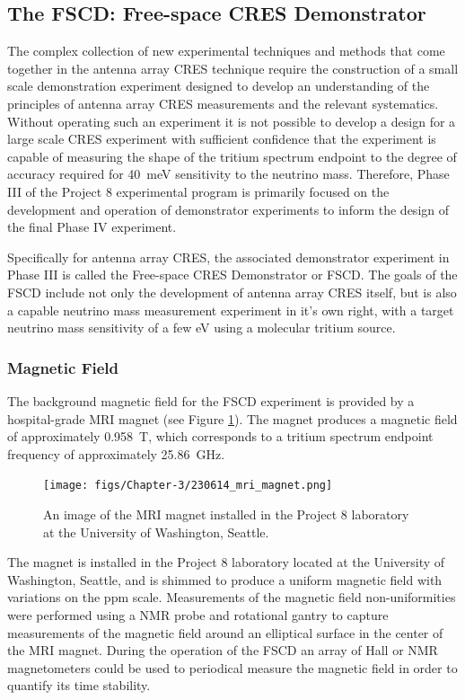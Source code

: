\subsection{The FSCD: Free-space CRES Demonstrator}

The complex collection of new experimental techniques and methods that come together in the antenna array CRES technique require the construction of a small scale demonstration experiment designed to develop an understanding of the principles of antenna array CRES measurements and the relevant systematics. Without operating such an experiment it is not possible to develop a design for a large scale CRES experiment with sufficient confidence that the experiment is capable of measuring the shape of the tritium spectrum endpoint to the degree of accuracy required for 40~meV sensitivity to the neutrino mass. Therefore, Phase III of the Project 8 experimental program is primarily focused on the development and operation of demonstrator experiments to inform the design of the final Phase IV experiment.

Specifically for antenna array CRES, the associated demonstrator experiment in Phase III is called the Free-space CRES Demonstrator or FSCD. The goals of the FSCD include not only the development of antenna array CRES itself, but is also a capable neutrino mass measurement experiment in it's own right, with a target neutrino mass sensitivity of a few eV using a molecular tritium source.  

\subsubsection*{Magnetic Field}

The background magnetic field for the FSCD experiment is provided by a hospital-grade MRI magnet (see Figure \ref{fig:chap3-mri-magnet}). The magnet produces a magnetic field of approximately 0.958~T, which corresponds to a tritium spectrum endpoint frequency of approximately 25.86~GHz. 
\begin{figure}[htbp]
    \centering
    \texttt{[image: figs/Chapter-3/230614\_mri\_magnet.png]}
    \caption{\label{fig:chap3-mri-magnet} An image of the MRI magnet installed in the Project 8 laboratory at the University of Washington, Seattle.}
\end{figure}
The magnet is installed in the Project 8 laboratory located at the University of Washington, Seattle, and is shimmed to produce a uniform magnetic field with variations on the ppm scale. Measurements of the magnetic field non-uniformities were performed using a NMR probe and rotational gantry to capture measurements of the magnetic field around an elliptical surface in the center of the MRI magnet. During the operation of the FSCD an array of Hall or NMR magnetometers could be used to periodical measure the magnetic field in order to quantify its time stability.

